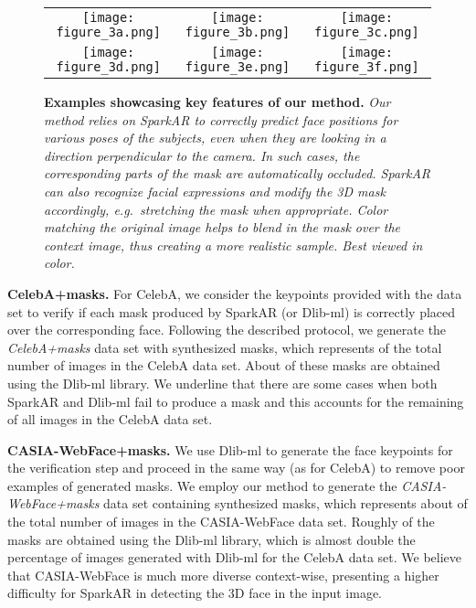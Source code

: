 \documentclass{article}
\begin{document}
\begin{figure}[t]
\begin{center}
\begin{tabular}{@{~}c@{~}c@{~}c}
   \texttt{[image: figure\_3a.png]} &
   \texttt{[image: figure\_3b.png]} &
   \texttt{[image: figure\_3c.png]} \\
\texttt{[image: figure\_3d.png]} &
   \texttt{[image: figure\_3e.png]} &
   \texttt{[image: figure\_3f.png]} 
   \end{tabular}
\end{center}
\vspace{-0.3cm}
   \caption{{\bf Examples showcasing key features of our method. }\emph{Our method relies on SparkAR to correctly predict face positions for various poses of the subjects, even when they are looking in a direction perpendicular to the camera. In such cases, the corresponding parts of the mask are automatically occluded. SparkAR can also recognize facial expressions and modify the 3D mask accordingly, e.g.~stretching the mask when appropriate.  Color matching the original image helps to blend in the mask over the context image, thus creating a more realistic sample. Best viewed in color.}}
\label{fig:key-features} 
\end{figure}





{\bf CelebA+masks.} For CelebA, we consider the keypoints provided with the data set to verify if each mask produced by SparkAR (or Dlib-ml) is correctly placed over the corresponding face. Following the described protocol, we generate the {\emph {CelebA+masks}} data set with  synthesized masks, which represents  of the total number of images in the CelebA data set. About  of these masks are obtained using the Dlib-ml library. We underline that there are some cases when both SparkAR and Dlib-ml fail to produce a mask and this accounts for the remaining  of all images in the CelebA data set.

{\bf CASIA-WebFace+masks.} We use Dlib-ml to generate the face keypoints for the verification step and proceed in the same way (as for CelebA) to remove poor examples of generated masks. We employ our method to generate the {\emph {CASIA-WebFace+masks}} data set containing  synthesized masks, which represents about  of the total number of images in the CASIA-WebFace data set. Roughly  of the masks are obtained using the Dlib-ml library, which is almost double the percentage of images generated with Dlib-ml for the CelebA data set. We believe that CASIA-WebFace is much more diverse context-wise, presenting a higher difficulty for SparkAR in detecting the 3D face in the input image.
\end{document}
